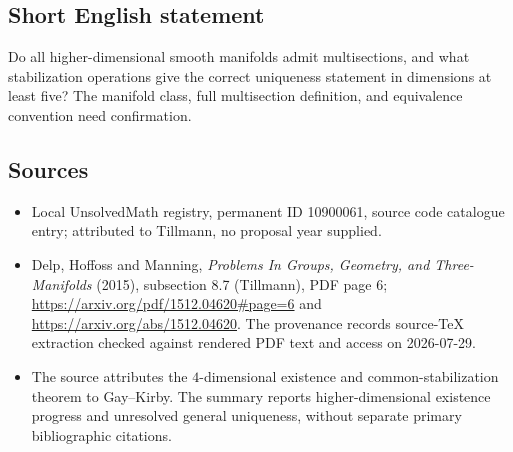 \documentclass[11pt]{article}
\begin{document}
\subsection{Short English statement}
Do all higher-dimensional smooth manifolds admit multisections, and what stabilization operations give the correct uniqueness statement in dimensions at least five? The manifold class, full multisection definition, and equivalence convention need confirmation.
\subsection{Sources}
\begin{itemize}
\item Local UnsolvedMath registry, permanent ID 10900061, source code catalogue entry; attributed to Tillmann, no proposal year supplied.
\item Delp, Hoffoss and Manning, \emph{Problems In Groups, Geometry, and Three-Manifolds} (2015), subsection 8.7 (Tillmann), PDF page 6; \url{https://arxiv.org/pdf/1512.04620#page=6} and \url{https://arxiv.org/abs/1512.04620}. The provenance records source-TeX extraction checked against rendered PDF text and access on 2026-07-29.
\item The source attributes the $4$-dimensional existence and common-stabilization theorem to Gay--Kirby. The summary reports higher-dimensional existence progress and unresolved general uniqueness, without separate primary bibliographic citations.
\end{itemize}
\end{document}

